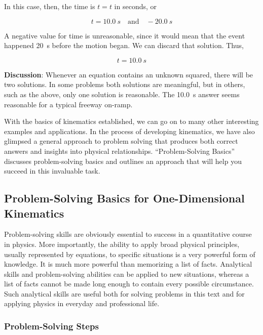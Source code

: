 \documentclass[main-ap-physics.tex]{subfiles}
\begin{document}
In this case, then, the time is $t = t$ in seconds, or

\begin{equation*}
     t = \SI{10.0}{s} \quad \text{and} \quad -\SI{20.0}{s}
\end{equation*}

A negative value for time is unreasonable, since it would mean that the event happened \SI{20}{s} before the motion began. We can discard that solution. Thus,

\begin{equation*}
    t = \SI{10.0}{s}
\end{equation*}

\textbf{Discussion}: Whenever an equation contains an unknown squared, there will be two solutions. In some problems both solutions are meaningful, but in others, such as the above, only one solution is reasonable. The \SI{10.0}{s} answer seems reasonable for a typical freeway on-ramp.

\endsolution

\vspace{1em}

With the basics of kinematics established, we can go on to many other interesting examples and applications. In the process of developing kinematics, we have also glimpsed a general approach to problem solving that produces both correct answers and insights into physical relationships. ``Problem-Solving Basics'' discusses problem-solving basics and outlines an approach that will help you succeed in this invaluable task.

\subsection{Problem-Solving Basics for One-Dimensional Kinematics}

Problem-solving skills are obviously essential to success in a quantitative course in physics. More importantly, the ability to apply broad physical principles, usually represented by equations, to specific situations is a very powerful form of knowledge. It is much more powerful than memorizing a list of facts. Analytical skills and problem-solving abilities can be applied to new situations, whereas a list of facts cannot be made long enough to contain every possible circumstance. Such analytical skills are useful both for solving problems in this text and for applying physics in everyday and professional life.

\subsubsection*{Problem-Solving Steps}
\end{document}
